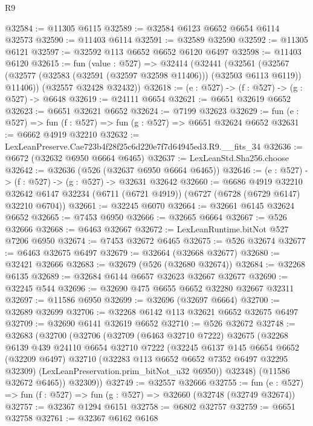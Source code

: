 \begin{lexlean}{R9}
\begin{coremodule}
@32584 := @11305 @6115
@32589 := @32584 @6123 @6652 @6654 @6114 @32573
@32590 := @11403 @6114
@32591 := @32589 @32590
@32592 := @11305 @6121
@32597 := @32592 @113 @6652 @6652 @6120 @6497
@32598 := @11403 @6120
@32615 := fun (value : @527) =>
  @32414
    (@32441
      (@32561
        (@32567 (@32577 (@32583 (@32591 (@32597 @32598 @11406))) (@32503 @6113 @6119)) @11406))
      (@32557 @32428 @32432))
@32618 := (e : @527) -> (f : @527) -> (g : @527) -> @6648
@32619 := @24111 @6654
@32621 := @6651 @32619 @6652
@32623 := @6651 @32621 @6652
@32624 := @7199 @32623
@32629 := fun (e : @527) => fun (f : @527) => fun (g : @527) => @6651 @32624 @6652
@32631 := @6662 @4919 @32210
@32632 := LexLeanPreserve.Cae723b4f28f25c6d220e7f7d64945ed3.R9.__fits_34
@32636 := @6672 (@32632 @6950 @6664 @6465)
@32637 := LexLeanStd.Sha256.choose
@32642 := @32636 (@526 (@32637 @6950 @6664 @6465))
@32646 := (e : @527) -> (f : @527) -> (g : @527) -> @32631 @32642
@32660 := @6686
    @4919
    @32210
    @32642
    @6147
    @32234
    (@6711 (@6721 @4919))
    (@6727 (@6728 (@6729 @6147) @32210 @6704))
@32661 := @32245 @6070
@32664 := @32661 @6145 @32624 @6652
@32665 := @7453 @6950
@32666 := @32665 @6664
@32667 := @526 @32666
@32668 := @6463 @32667
@32672 := LexLeanRuntime.bitNot @527 @7206 @6950
@32674 := @7453 @32672 @6465
@32675 := @526 @32674
@32677 := @6463 @32675 @6497
@32679 := @32664 (@32668 @32677)
@32680 := @32421 @32666
@32683 := @32679 (@526 (@32680 @32674))
@32684 := @32268 @6135
@32689 := @32684 @6144 @6657 @32623 @32667 @32677
@32690 := @32245 @544
@32696 := @32690 @475 @6655 @6652 @32280 @32667 @32311
@32697 := @11586 @6950
@32699 := @32696 (@32697 @6664)
@32700 := @32689 @32699
@32706 := @32268 @6142 @113 @32621 @6652 @32675 @6497
@32709 := @32690 @6141 @32619 @6652
@32710 := @526 @32672
@32748 := @32683
    (@32700
      (@32706
        (@32709
          (@6463 @32710 @7222)
          @32675
          (@32268
            @6139
            @439
            @24110
            @6654
            @32710
            @7222
            (@32245
              @6137
              @145
              @6654
              @6652
              (@32209 @6497)
              @32710
              (@32283 @113 @6652 @6652 @7352 @6497 @32295 @32309)
              (LexLeanPreservation.prim_bitNot_u32 @6950))
            @32348)
          (@11586 @32672 @6465))
        @32309))
@32749 := @32557 @32666
@32755 := fun (e : @527) => fun (f : @527) => fun (g : @527) => @32660 (@32748 (@32749 @32674))
@32757 := @32367 @1294 @6151
@32758 := @6802 @32757
@32759 := @6651 @32758
@32761 := @32367 @6162 @6168

\end{coremodule}
\end{lexlean}
